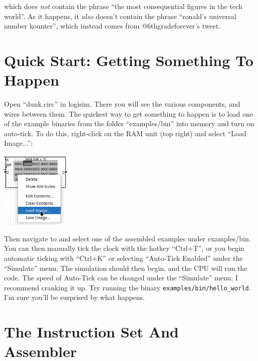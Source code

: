 \documentclass{article}
\begin{document}
which does \textit{not} contain the phrase ``the most consequential figures in the tech world''. As it happens, it \textit{also} doesn't contain the phrase ``ronald's universal number kounter'', which instead comes from @6thgradeforever's tweet.

\section{Quick Start: Getting Something To Happen}

Open ``dunk.circ'' in logisim. There you will see the various components, and wires between them. The quickest way to get something to happen is to load one of the example binaries from the folder ``examples/bin'' into memory and turn on auto-tick. To do this, right-click on the RAM unit (top right) and select ``Load Image...'';

    \begin{center}\includegraphics[width=0.25\textwidth]{images/load_image.png}\end{center}

Then navigate to and select one of the assembled examples under examples/bin. You can then manually tick the clock with the hotkey ``Ctrl+T'', or you begin automatic ticking with ``Ctrl+K'' or selecting ``Auto-Tick Enabled'' under the ``Simulate'' menu. The simulation should then begin, and the CPU will run the code. The speed of Auto-Tick can be changed under the ``Simulate'' menu; I recommend cranking it up. Try running the binary \Verb|examples/bin/hello_world|. I'm sure you'll be surprised by what happens.

\section{The Instruction Set And Assembler}
\end{document}
